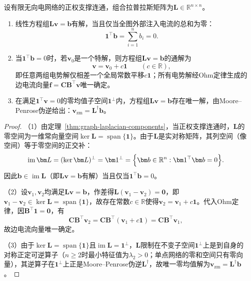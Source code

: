 \begin{theorem}[拉普拉斯方程的可解性与解集结构]
\label{thm:electrical-laplacian-solvability}
设有限无向电网络的正权支撑连通，组合拉普拉斯矩阵为$\bm L\in\mathbb R^{n\times n}$。
\begin{enumerate}
  \item 线性方程组$\bm L\bm v=\bm b$有解，当且仅当全图外部注入电流的总和为零：
  \begin{equation}
    \bm 1^\top\bm b = \sum_{i=1}^n b_i = 0.
    \label{eq:electrical-zero-sum-condition}
  \end{equation}
  \item 当$\bm 1^\top\bm b=0$时，若$\bm v_0$是一个特解，则方程组$\bm L\bm v=\bm b$的通解为
  \[
    \bm v = \bm v_0 + c\bm 1 \qquad (c\in\mathbb R),
  \]
  即任意两组电势解仅相差一个全局常数平移$c\bm 1$；所有电势解经Ohm定律生成的边电流向量$\bm f=\bm C\bm B^\top\bm v$唯一确定。
  \item 在满足$\bm 1^\top\bm v=0$的零均值子空间$\bm 1^\perp$内，方程组$\bm L\bm v=\bm b$存在唯一解，由Moore--Penrose伪逆给出：$\bm v_{\mathrm{zm}} = \bm L^\dagger\bm b$。
\end{enumerate}
\end{theorem}

\begin{proof}
（1）由定理~\ref{thm:graph-laplacian-components}，当正权支撑连通时，$\bm L$的零空间为一维常向量空间$\ker\bm L=\operatorname{span}\{\bm 1\}$。由于$\bm L$是实对称矩阵，其列空间（像空间）等于零空间的正交补：
\[
  \operatorname{im}\bm L = (\ker\bm L)^\perp = \bm 1^\perp = \Bigl\{\bm b\in\mathbb R^n : \bm 1^\top\bm b = 0\Bigr\}.
\]
因此$\bm b\in\operatorname{im}\bm L$（即$\bm L\bm v=\bm b$有解）当且仅当$\bm 1^\top\bm b = 0$。

（2）设$\bm v_1,\bm v_2$均满足$\bm L\bm v=\bm b$，作差得$\bm L(\bm v_1-\bm v_2)=\bm 0$，即$\bm v_1-\bm v_2\in\ker\bm L=\operatorname{span}\{\bm 1\}$，故存在常数$c\in\mathbb R$使得$\bm v_2=\bm v_1+c\bm 1$。代入Ohm定律，因$\bm B^\top\bm 1=\bm 0$，有
\[
  \bm C\bm B^\top\bm v_2 = \bm C\bm B^\top(\bm v_1 + c\bm 1) = \bm C\bm B^\top\bm v_1,
\]
故边电流向量唯一确定。

（3）由于$\ker\bm L=\operatorname{span}\{\bm 1\}$且$\operatorname{im}\bm L=\bm 1^\perp$，$\bm L$限制在不变子空间$\bm 1^\perp$上是到自身的对称正定可逆算子（$n\geq2$时最小特征值为$\lambda_2>0$；单点网络的零和空间只有零向量），其逆算子在$\bm 1^\perp$上正是Moore--Penrose伪逆$\bm L^\dagger$，故唯一零均值解为$\bm v_{\mathrm{zm}}=\bm L^\dagger\bm b$。
\end{proof}


